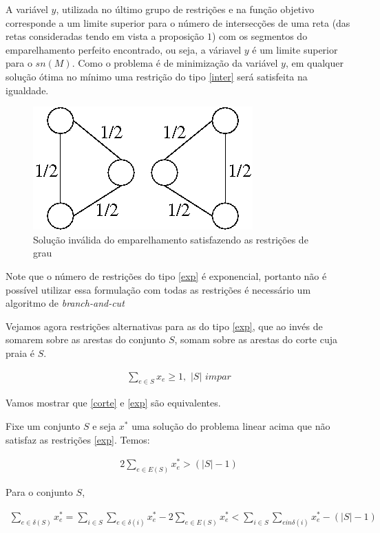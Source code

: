 \documentclass[11pt]{article}
\begin{document}
A variável $y$, utilizada no último grupo de restrições e na função
objetivo corresponde a um limite superior para o número de
intersecções de uma reta (das retas consideradas tendo em vista a
proposição $1$) com os segmentos do emparelhamento perfeito
encontrado, ou seja, a váriavel $y$ é um limite superior para o
$sn(M)$. Como o problema é de minimização da variável $y$, em qualquer
solução ótima no mínimo uma restrição do tipo \eqref{inter} será
satisfeita na igualdade.

\begin{figure}[H]
\centering
\includegraphics[scale=0.50]{ciclos}
\caption{Solução inválida do emparelhamento satisfazendo as restrições
  de grau}
\label{fig:ciclo_impar}
\end{figure}

Note que o número de restrições do tipo \eqref{exp} é exponencial,
portanto não é possível utilizar essa formulação com todas as
restrições é necessário um algoritmo de \emph{branch-and-cut}

Vejamos agora restrições alternativas para as do tipo \eqref{exp}, que
ao invés de somarem sobre as arestas do conjunto $S$, somam sobre as
arestas do corte cuja praia é $S$.

\begin{align}
  \sum_{e \in S}{x_e} \ge 1, \hspace{4pt}|S|\hspace{4pt} impar \label{corte}
\end{align}

Vamos mostrar que \eqref{corte} e \eqref{exp} são equivalentes.

Fixe um conjunto $S$ e seja $x^*$ uma solução do problema linear acima
que não satisfaz as restrições \eqref{exp}. Temos:

\begin{align}
  2\sum_{e \in E(S)}x_e^* > (|S| - 1)
\end{align}

Para o conjunto $S$,

\begin{align}
  \sum_{e \in \delta (S)}x_e^* = \sum_{i \in S}\sum_{e \in \delta
    (i)}x_e^* - 2\sum_{e \in E(S)}x_e^* < \sum_{i \in S}\sum_{e in
    \delta (i)}x_e^* - (|S| - 1)
\end{align}
\end{document}
